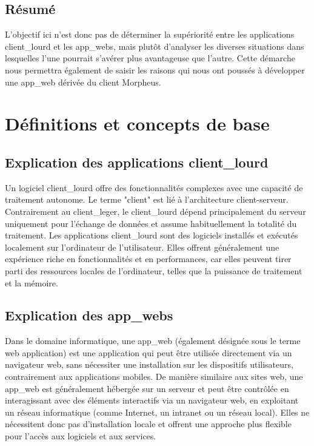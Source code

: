 \documentclass[a4paper, 12pt, french]{article}
\begin{document}
			\subsection{Résumé}
				L'objectif ici n'est donc pas de déterminer la supériorité entre les applications \gls{client_lourd} et les \glspl{app_web}, mais plutôt d'analyser les diverses situations dans lesquelles l'une pourrait s'avérer plus avantageuse que l'autre. Cette démarche nous permettra également de saisir les raisons qui nous ont poussés à développer une \gls{app_web} dérivée du client Morpheus.				

		\newpage
		\section{Définitions et concepts de base}
			\subsection{Explication des applications \gls{client_lourd}}
				Un logiciel \gls{client_lourd} offre des fonctionnalités complexes avec une capacité de traitement autonome. Le terme "client" est lié à l'architecture client-serveur. Contrairement au \gls{client_leger}, le \gls{client_lourd} dépend principalement du serveur uniquement pour l'échange de données et assume habituellement la totalité du traitement. Les applications \gls{client_lourd} sont des logiciels installés et exécutés localement sur l'ordinateur de l'utilisateur. Elles offrent généralement une expérience riche en fonctionnalités et en performances, car elles peuvent tirer parti des ressources locales de l'ordinateur, telles que la puissance de traitement et la mémoire.
			
			\subsection{Explication des \glspl{app_web}}
				Dans le domaine informatique, une \gls{app_web} (également désignée sous le terme web application) est une application qui peut être utilisée directement via un navigateur web, sans nécessiter une installation sur les dispositifs utilisateurs, contrairement aux applications mobiles. De manière similaire aux sites web, une \gls{app_web} est généralement hébergée sur un serveur et peut être contrôlée en interagissant avec des éléments interactifs via un navigateur web, en exploitant un réseau informatique (comme Internet, un intranet ou un réseau local). Elles ne nécessitent donc pas d'installation locale et offrent une approche plus flexible pour l'accès aux logiciels et aux services.
			
\end{document}
